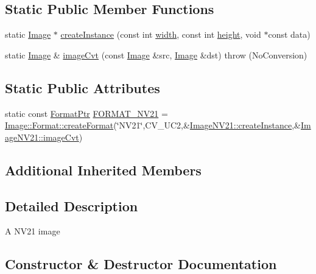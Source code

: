 \subsection*{Static Public Member Functions}
\begin{DoxyCompactItemize}
\item 
static \hyperlink{classcolorspaces_1_1_image}{Image} $\ast$ \hyperlink{classcolorspaces_1_1_image_n_v21_abbde9b9d723828ab4885274347b6e24c}{create\+Instance} (const int \hyperlink{classcolorspaces_1_1_image_ab80af7d4797110c23ed575b329ec7c4f}{width}, const int \hyperlink{classcolorspaces_1_1_image_a99a05ebd37f61215b2c3042ecaefdbfc}{height}, void $\ast$const data)
\item 
static \hyperlink{classcolorspaces_1_1_image}{Image} \& \hyperlink{classcolorspaces_1_1_image_n_v21_a5ffbf749cb0a371b5f83246b994e5dc8}{image\+Cvt} (const \hyperlink{classcolorspaces_1_1_image}{Image} \&src, \hyperlink{classcolorspaces_1_1_image}{Image} \&dst)  throw (\+No\+Conversion)
\end{DoxyCompactItemize}
\subsection*{Static Public Attributes}
\begin{DoxyCompactItemize}
\item 
static const \hyperlink{classcolorspaces_1_1_image_ab3978cc7acc2b5e855f8c715f09667d1}{Format\+Ptr} \hyperlink{classcolorspaces_1_1_image_n_v21_aa7e4ffadaba25b5b888123c955c63499}{F\+O\+R\+M\+A\+T\+\_\+\+N\+V21} = \hyperlink{classcolorspaces_1_1_image_1_1_format_ae79208f237b72cf596331ebcec2ff58b}{Image\+::\+Format\+::create\+Format}(\char`\"{}N\+V21\char`\"{},C\+V\+\_\+U\+C2,\&\hyperlink{classcolorspaces_1_1_image_n_v21_abbde9b9d723828ab4885274347b6e24c}{Image\+N\+V21\+::create\+Instance},\&\hyperlink{classcolorspaces_1_1_image_n_v21_a5ffbf749cb0a371b5f83246b994e5dc8}{Image\+N\+V21\+::image\+Cvt})
\end{DoxyCompactItemize}
\subsection*{Additional Inherited Members}


\subsection{Detailed Description}
A N\+V21 image 

\subsection{Constructor \& Destructor Documentation}
\mbox{\label{classcolorspaces_1_1_image_n_v21_a11da1ed1be50dc0c03ebe5816bf3f820}} 
